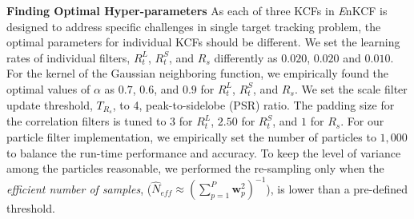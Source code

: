 \documentclass[10pt,twocolumn,letterpaper]{article}
\begin{document}
\textbf{Finding Optimal Hyper-parameters} As each of three KCFs in
       {\it E}nKCF is designed to address specific challenges in
       single target tracking problem, the optimal parameters for
       individual KCFs should be different. We set the learning rates
       of individual filters, $R_{t}^{L}$, $R_{t}^{S}$, and $R_{s}$
       differently as $0.020$, $0.020$ and $0.010$. For the kernel of
       the Gaussian neighboring function, we empirically found the
       optimal values of $\alpha$ as $0.7$, $0.6$, and $0.9$ for
       $R_{t}^{L}$, $R_{t}^{S}$, and $R_{s}$. We set the scale filter
       update threshold, $T_{R_{s}}$, to 4, peak-to-sidelobe (PSR)
       ratio. The padding size for the correlation filters is tuned to
       $3$ for $R_{t}^{L}$, $2.50$ for $R_{t}^{S}$, and $1$ for
       $R_{s}$. For our particle filter implementation, we empirically
       set the number of particles to $1,000$ to balance the run-time
       performance and accuracy. To keep the level of variance among
       the particles reasonable, we performed the re-sampling only
       when the \textit{efficient number of samples}, ($ \hat{N}_{eff}
       \approx (\sum_{p=1}^{P}\mathbf{w}_{p}^{2})^{-1} $), is lower than a
       pre-defined threshold.
\end{document}
